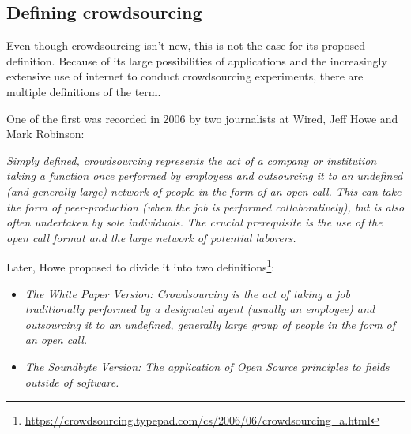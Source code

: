 \subsection{Defining crowdsourcing}
\label{sub:definition-crowdsourcing}

Even though crowdsourcing isn't new, this is not the case for its proposed definition.
Because of its large possibilities of applications and the increasingly extensive use of internet to conduct crowdsourcing experiments, there are multiple definitions of the term.

One of the first was recorded in 2006 by two journalists at Wired, Jeff Howe and Mark Robinson:
\begin{center}
\begin{minipage}{.75\textwidth}
    \emph{Simply defined, crowdsourcing represents the act of a company or institution taking a function once performed by employees and outsourcing it to an undefined (and generally large) network of people in the form of an open call. This can take the form of peer-production (when the job is performed collaboratively), but is also often undertaken by sole individuals. The crucial prerequisite is the use of the open call format and the large network of potential laborers.}
\end{minipage}
\end{center}
Later, Howe proposed to divide it into two definitions\footnote{\url{https://crowdsourcing.typepad.com/cs/2006/06/crowdsourcing_a.html}}:
\begin{center}
\begin{minipage}{.75\textwidth}
\begin{itemize}
    \item \emph{The White Paper Version: Crowdsourcing is the act of taking a job traditionally performed by a designated agent (usually an employee) and outsourcing it to an undefined, generally large group of people in the form of an open call.
}
    \item \emph{The Soundbyte Version: The application of Open Source principles to fields outside of software.
}
\end{itemize}
\end{minipage}
\end{center}

